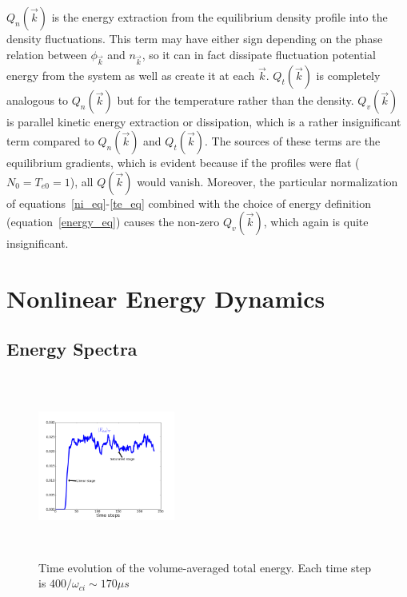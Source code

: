 \documentclass[showpacs,preprintnumbers,amsmath,amssymb,superscriptaddress]{revtex4}
\begin{document}
$Q_n(\vec{k})$ is the energy extraction from the equilibrium density profile into the density fluctuations. 
This term may have either sign depending on the phase relation between $\phi_{\vec{k}}$ and $n_{\vec{k}}$, 
so it can in fact dissipate fluctuation potential energy from the system as well as create it
at each $\vec{k}$. $Q_t(\vec{k})$ is completely analogous to $Q_n(\vec{k})$ but for the temperature rather than the density. 
$Q_v(\vec{k})$ is parallel kinetic energy extraction or dissipation, which is a rather insignificant term compared to $Q_n(\vec{k})$ and $Q_t(\vec{k})$.
The sources of these terms are the equilibrium gradients, which is evident because if the profiles
were flat ($N_0=T_{e0}=1$), all $Q(\vec{k})$ would vanish.
Moreover, the particular normalization of equations~\ref{ni_eq}-\ref{te_eq} combined with the choice of energy definition (equation~\ref{energy_eq}) causes the non-zero $Q_v(\vec{k})$, which again
is quite insignificant.


\section{Nonlinear Energy Dynamics}
\label{nl_en_dynamics_sec}

\subsection{Energy Spectra}

\begin{figure}[!htbp]
\includegraphics[width=0.40\textwidth,height=60mm]{time_evolution}
\hfil
\caption{Time evolution of the volume-averaged total energy. Each time step is $400/\omega_{ci} \sim 170 \mu s$}
\label{time_evolution}
\end{figure}
\end{document}
